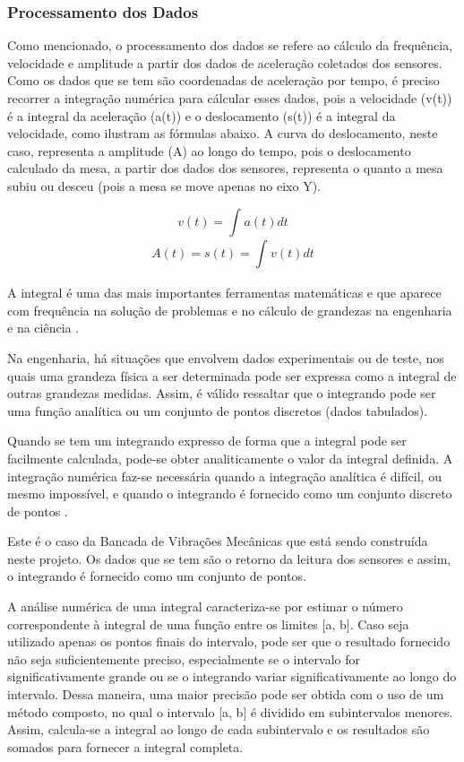 \subsubsection*{\textbf{Processamento dos Dados}} \label{software:processamento}

Como mencionado, o processamento dos dados se refere ao cálculo da frequência, velocidade e amplitude a partir dos dados de aceleração
coletados dos sensores. Como os dados que se tem são coordenadas de aceleração por tempo, é preciso recorrer a integração numérica para 
cálcular esses dados, pois a velocidade (v(t)) é a integral da aceleração (a(t)) e o deslocamento (s(t)) é a integral da velocidade, como 
ilustram as fórmulas abaixo. A curva do deslocamento, neste caso, representa a amplitude (A) ao longo do tempo, pois o deslocamento calculado
da mesa, a partir dos dados dos sensores, representa o quanto a mesa subiu ou desceu (pois a mesa se move apenas no eixo Y).

$$ v(t) = \int_{}^{} a(t) dt$$
$$ A(t) = s(t) = \int_{}^{} v(t) dt$$


A integral é uma das mais importantes ferramentas matemáticas e que aparece com frequência na solução de problemas e no cálculo de grandezas 
na engenharia e na ciência \cite{metodos_numericos}.

Na engenharia, há situações que envolvem dados experimentais ou de teste, nos quais uma grandeza física a ser determinada pode ser expressa 
como a integral de outras grandezas medidas. Assim, é válido ressaltar que o integrando pode ser uma função analítica ou um conjunto de pontos
discretos (dados tabulados).

Quando se tem um integrando expresso de forma que a integral pode ser facilmente calculada, pode-se obter analiticamente o valor da integral 
definida. A integração numérica faz-se necessária quando a integração analítica é difícil, ou mesmo impossível, e quando o integrando é fornecido
como um conjunto discreto de pontos \cite{metodos_numericos}.

Este é o caso da Bancada de Vibrações Mecânicas que está sendo construída neste projeto. Os dados que se tem são o retorno da leitura dos sensores 
e assim, o integrando é fornecido como um conjunto de pontos.

A análise numérica de uma integral caracteriza-se por estimar o número correspondente à integral de uma função entre os limites [a, b]. 
Caso seja utilizado apenas os pontos finais do intervalo, pode ser que o resultado fornecido não seja suficientemente preciso, especialmente se
o intervalo for significativamente grande ou se o integrando variar significativamente ao longo do intervalo. Dessa maneira, uma maior precisão 
pode ser obtida com o uso de um método composto, no qual o intervalo [a, b] é dividido em subintervalos menores. Assim, calcula-se a integral ao
longo de cada subintervalo e os resultados são somados para fornecer a integral completa.

